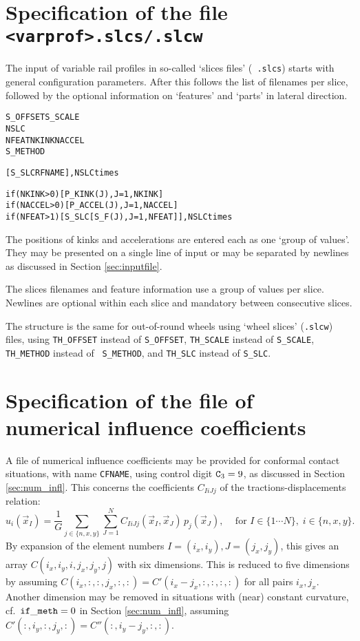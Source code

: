 \documentclass[12pt]{report}
\begin{document}
\section{Specification of the file {\tt <varprof>.slcs/.slcw}}
\label{sec:spec_slcs}

The input of variable rail profiles in so-called `slices files' ({\tt
.slcs}) starts with general configuration parameters. After this follows
the list of filenames per slice, followed by the optional information on
`features' and `parts' in lateral direction.

\begin{alltt}\small
% General parameters and counters

S_OFFSET   S_SCALE
NSLC
NFEAT      NKINK      NACCEL
S_METHOD

% Slice positions and filenames per slice

[ S_SLC     RFNAME ],  NSLC times

% Feature information per slice

if (NKINK >0)  [ P_KINK(J),  J=1,NKINK    ]
if (NACCEL>0)  [ P_ACCEL(J), J=1,NACCEL   ]
if (NFEAT >1)  [ S_SLC  [ S_F(J), J=1,NFEAT ] ],  NSLC times
\end{alltt}
The positions of kinks and accelerations are entered each as one `group of
values'. They may be presented on a single line of input or may be separated
by newlines as discussed in Section \ref{sec:inputfile}.

The slices filenames and feature information use a group of values
per slice. Newlines are optional within each slice and mandatory between
consecutive slices. 

The structure is the same for out-of-round wheels using `wheel slices'
({\tt .slcw}) files, using {\tt TH\_\-OFF\-SET} instead of {\tt S\_OFFSET},
{\tt TH\_SCALE} instead of {\tt S\_SCALE}, {\tt TH\_METHOD} instead of {\tt
S\_METHOD}, and {\tt TH\_SLC} instead of {\tt S\_SLC}.

\section{Specification of the file of numerical influence coefficients}
\label{sec:spec_inflcf}

A file of numerical influence coefficients may be provided for conformal
contact situations, with name {\tt CFNAME}, using control digit
${\tt C}_3=9$, as discussed in Section \ref{sec:num_infl}. This concerns
the coefficients $C_{IiJj}$ of the tractions-displacements relation:
\begin{equation}\label{eq:ui_sum_Cij_pj}
    u_i(\vec{x}_I) = \frac{1}{G} \sum_{j\in\{n,x,y\}}\sum_{J=1}^N
        C_{IiJj}(\vec{x}_I,\vec{x}_J) \, p_j(\vec{x}_J), \;\;\;
        \mbox{ for } I\in\{1\cdots N\}, \; i\in \{n,x,y\}.
\end{equation}
By expansion of the element numbers $I=(i_x,i_y), J=(j_x,j_y)$, this gives
an array $C(i_x,i_y,i,j_x,j_y,j)$ with six dimensions. This is reduced to five
dimensions by assuming $C(i_x,:,:,j_x,:,:)=C'(i_x-j_x,:,:,:,:)$ for all
pairs $i_x,j_x$. Another dimension may be removed in situations with
(near) constant curvature, cf.\ ${\tt if\_meth}=0$ in Section
\ref{sec:num_infl}, assuming $C'(:,i_y,:,j_y,:)=C''(:,i_y-j_y,:,:)$.
\end{document}

